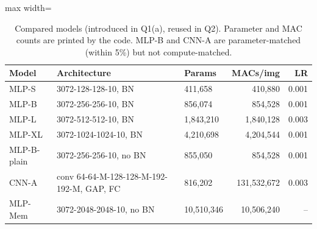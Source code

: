 \begin{table}[t]\centering\footnotesize\setlength{\tabcolsep}{3pt}
\begin{adjustbox}{max width=\textwidth}
\begin{tabular}{lllrr}\toprule
Model & Architecture & Params & MACs/img & LR \\\midrule
MLP-S & 3072-128-128-10, BN & 411,658 & 410,880 & 0.001 \\
MLP-B & 3072-256-256-10, BN & 856,074 & 854,528 & 0.001 \\
MLP-L & 3072-512-512-10, BN & 1,843,210 & 1,840,128 & 0.003 \\
MLP-XL & 3072-1024-1024-10, BN & 4,210,698 & 4,204,544 & 0.001 \\
MLP-B-plain & 3072-256-256-10, no BN & 855,050 & 854,528 & 0.001 \\
CNN-A & conv 64-64-M-128-128-M-192-192-M, GAP, FC & 816,202 & 131,532,672 & 0.003 \\
MLP-Mem & 3072-2048-2048-10, no BN & 10,510,346 & 10,506,240 & -- \\
\bottomrule\end{tabular}
\end{adjustbox}
\caption{Compared models (introduced in Q1(a), reused in Q2). Parameter and MAC counts are printed by the code. MLP-B and CNN-A are parameter-matched (within 5\%) but not compute-matched.}\label{tab:models}\end{table}
